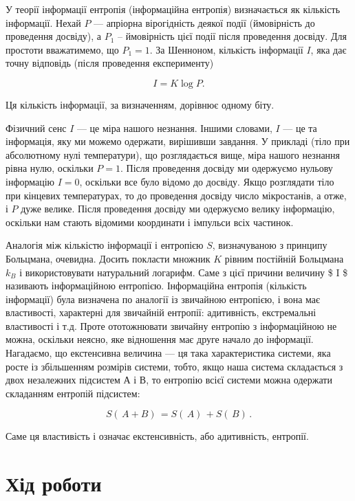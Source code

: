 \documentclass[
  letterpaper,
]{report}
\begin{document}
У теорії інформації ентропія (інформаційна ентропія) визначається як
кількість інформації. Нехай \(P\) --- апріорна вірогідність деякої події
(ймовірність до проведення досвіду), а \(P_{1}\) -- ймовірність цієї
події після проведення досвіду. Для простоти вважатимемо, що
\(P_{1} = 1\). За Шенноном, кількість інформації \(I\), яка дає точну
відповідь (після проведення експерименту)

\[ 
I = K \log{P}. 
\]

Ця кількість інформації, за визначенням, дорівнює одному біту.

Фізичний сенс \(I\) --- це міра нашого незнання. Іншими словами, \(I\)
--- це та інформація, яку ми можемо одержати, вирішивши завдання. У
прикладі (тіло при абсолютному нулі температури), що розглядається вище,
міра нашого незнання рівна нулю, оскільки \(P = 1\). Після проведення
досвіду ми одержуємо нульову інформацію \(I = 0\), оскільки все було
відомо до досвіду. Якщо розглядати тіло при кінцевих температурах, то до
проведення досвіду число мікростанів, а отже, і \(P\) дуже велике. Після
проведення досвіду ми одержуємо велику інформацію, оскільки нам стають
відомими координати і імпульси всіх частинок.

Аналогія між кількістю інформації і ентропією \(S\), визначуваною з
принципу Больцмана, очевидна. Досить покласти множник \(K\) рівним
постійній Больцмана \(k_{B}\) і використовувати натуральний логарифм.
Саме з цієї причини величину \$ I \$ називають інформаційною ентропією.
Інформаційна ентропія (кількість інформації) була визначена по аналогії
із звичайною ентропією, і вона має властивості, характерні для звичайній
ентропії: адитивність, екстремальні властивості і т.д. Проте
ототожнювати звичайну ентропію з інформаційною не можна, оскільки
неясно, яке відношення має друге начало до інформації. Нагадаємо, що
екстенсивна величина --- ця така характеристика системи, яка росте із
збільшенням розмірів системи, тобто, якщо наша система складається з
двох незалежних підсистем \(А\) і \(В\), то ентропію всієї системи можна
одержати складанням ентропій підсистем:

\[ 
S(\,A+B)\, = S(\,A)\, + S(\,B)\,. 
\]

Саме ця властивість і означає екстенсивність, або адитивність, ентропії.

\hypertarget{ux445ux456ux434-ux440ux43eux431ux43eux442ux438-4}{%
\section{Хід
роботи}\label{ux445ux456ux434-ux440ux43eux431ux43eux442ux438-4}}
\end{document}
